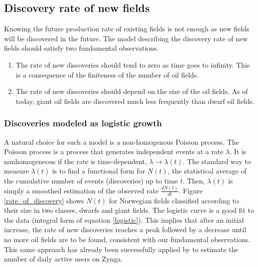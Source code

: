 \documentclass[review]{elsarticle}
\begin{document}
\subsection{Discovery rate of new fields\label{sub:Discovery-rate-of}}

Knowing the future production rate of existing fields is not enough
as new fields will be discovered in the future. The model describing
the discovery rate of new fields should satisfy two fundamental observations.
\begin{enumerate}
\item The rate of new discoveries should tend to zero as time goes to infinity.
This is a consequence of the finiteness of the number of oil fields. 
\item The rate of new discoveries should depend on the size of the oil fields.
As of today, giant oil fields are discovered much less frequently
than dwarf oil fields.
\end{enumerate}

\subsubsection{Discoveries modeled as logistic growth\label{sub:Discoveries-modeled-as}}

A natural choice for such a model is a non-homogenous Poisson process.
The Poisson process is a process that generates independent events
at a rate $\lambda$. It is nonhomogeneous if the rate is time-dependent,
$\lambda\rightarrow\lambda(t)$. The standard way to measure $\lambda(t)$
is to find a functional form for $N(t)$, the statistical average
of the cumulative number of events (discoveries) up to time $t$.
Then, $\lambda(t)$ is simply a smoothed estimation 
of the observed rate $\frac{dN(t)}{dt}$. Figure \ref{rate_of_discovery}
shows $N(t)$ for Norwegian fields classified according to their size in two classes, 
dwarfs and giant fields. 
The logistic curve is a good fit to the data (integral form of equation
\ref{logistic}). This implies that after an initial increase, the
rate of new discoveries reaches a peak followed by a decrease until
no more oil fields are to be found, consistent with our fundamental
observations. This same approach has already been successfully applied
by \cite{Forro2012} to estimate the number of daily active
users on Zynga.
\end{document}
